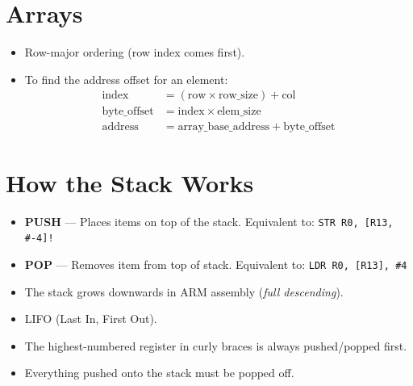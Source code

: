 \documentclass[a4paper, 10pt]{article}
\begin{document}
\section{Arrays}

\begin{itemize}
  \item Row-major ordering (row index comes first).
  \item To find the address offset for an element:
        \begin{align*}
          \text{index}        &= (\text{row} \times \text{row\_size}) + \text{col} \\
          \text{byte\_offset} &= \text{index} \times \text{elem\_size}             \\
          \text{address}      &= \text{array\_base\_address} + \text{byte\_offset}
        \end{align*}
\end{itemize}

\section{How the Stack Works}
\begin{itemize}
  \item \textbf{PUSH} --- Places items on top of the stack.
        Equivalent to: \texttt{STR R0, [R13, \#-4]!}
  \item \textbf{POP} --- Removes item from top of stack.
        Equivalent to: \texttt{LDR R0, [R13], \#4}
  \item The stack grows downwards in ARM assembly (\emph{full descending}).
  \item LIFO (Last In, First Out).
  \item The highest-numbered register in curly braces is always pushed/popped first.
  \item Everything pushed onto the stack must be popped off.
\end{itemize}

\end{document}
